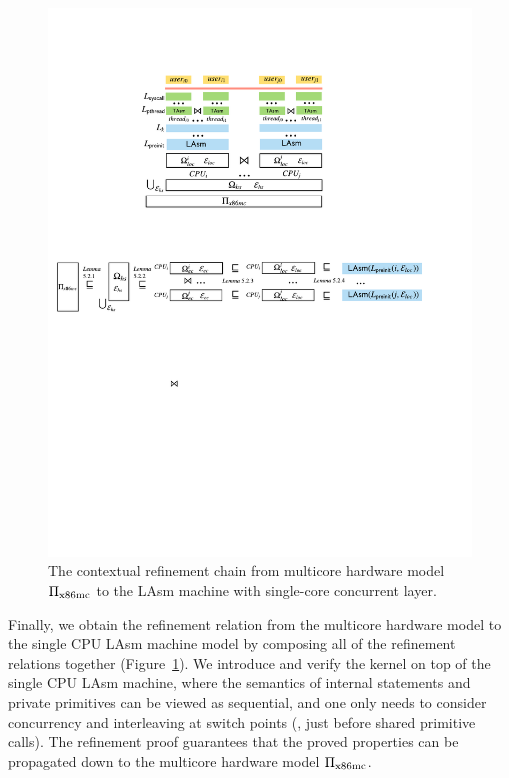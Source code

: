 \begin{figure}[t]\centering
\includegraphics[scale=0.8]{figs/machine_chain}
\caption{The contextual refinement chain from multicore hardware model
$\Pi_{\text{x86mc}}$ to the LAsm machine
with single-core concurrent layer.}
\label{fig:spec:chain}
\hrulefill
\end{figure}

Finally, we obtain the refinement relation from the multicore
hardware model
to the single CPU LAsm machine model by composing
all of the refinement relations together (\cf Figure~\ref{fig:spec:chain}).
We introduce and verify the {\cCTOS} kernel on top of the
single CPU LAsm machine,
where the semantics of internal statements
and private primitives can be viewed as sequential,
and one only needs to consider concurrency
and interleaving at switch points (\ie, just before 
shared primitive calls).
The refinement proof guarantees that the proved properties can be
propagated down to the multicore hardware model $\Pi_{\text{x86mc}}$.



